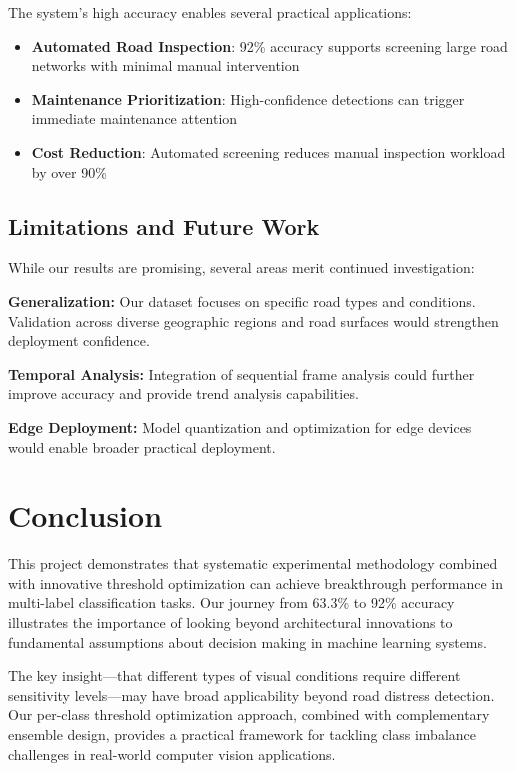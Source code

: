 \documentclass[12pt,twocolumn]{article}
\begin{document}
The system's high accuracy enables several practical applications:

\begin{itemize}[itemsep=1pt,parsep=0pt,topsep=3pt]
\item \textbf{Automated Road Inspection}: 92\% accuracy supports screening large road networks with minimal manual intervention
\item \textbf{Maintenance Prioritization}: High-confidence detections can trigger immediate maintenance attention
\item \textbf{Cost Reduction}: Automated screening reduces manual inspection workload by over 90\%
\end{itemize}

\subsection{Limitations and Future Work}

While our results are promising, several areas merit continued investigation:

\textbf{Generalization:} Our dataset focuses on specific road types and conditions. Validation across diverse geographic regions and road surfaces would strengthen deployment confidence.

\textbf{Temporal Analysis:} Integration of sequential frame analysis could further improve accuracy and provide trend analysis capabilities.

\textbf{Edge Deployment:} Model quantization and optimization for edge devices would enable broader practical deployment.

\section{Conclusion}

This project demonstrates that systematic experimental methodology combined with innovative threshold optimization can achieve breakthrough performance in multi-label classification tasks. Our journey from 63.3\% to 92\% accuracy illustrates the importance of looking beyond architectural innovations to fundamental assumptions about decision making in machine learning systems.

The key insight—that different types of visual conditions require different sensitivity levels—may have broad applicability beyond road distress detection. Our per-class threshold optimization approach, combined with complementary ensemble design, provides a practical framework for tackling class imbalance challenges in real-world computer vision applications.
\end{document}
